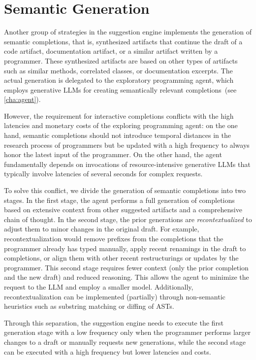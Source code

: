 
\section{Semantic Generation}
\label{sec:suggestions/generation}

Another group of strategies in the suggestion engine implements the generation of semantic completions, that is, synthesized artifacts that continue the draft of a code artifact, documentation artifact, or a similar artifact written by a programmer.
These synthesized artifacts are based on other types of artifacts such as similar methods, correlated classes, or documentation excerpts.
The actual generation is delegated to the exploratory programming agent, which employs generative LLMs for creating semantically relevant completions~(see \cref{cha:agent}).

However, the requirement for interactive completions conflicts with the high latencies and monetary costs of the exploring programming agent:
on the one hand, semantic completions should not introduce temporal distances in the research process of programmers but be updated with a high frequency to always honor the latest input of the programmer.
On the other hand, the agent fundamentally depends on invocations of resource-intensive generative LLMs that typically involve latencies of several seconds for complex requests.

To solve this conflict, we divide the generation of semantic completions into two stages.
In the first stage, the agent performs a full generation of completions based on extensive context from other suggested artifacts and a comprehensive chain of thought.
In the second stage, the prior generations are \emph{recontextualized} to adjust them to minor changes in the original draft.
For example, recontextualization would remove prefixes from the completions that the programmer already has typed manually, apply recent renamings in the draft to completions, or align them with other recent restructurings or updates by the programmer.
This second stage requires fewer context (only the prior completion and the new draft) and reduced reasoning.
This allows the agent to minimize the request to the LLM and employ a smaller model.
Additionally, recontextualization can be implemented (partially) through non-semantic heuristics such as substring matching or diffing of ASTs.

Through this separation, the suggestion engine needs to execute the first generation stage with a low frequency only when the programmer performs larger changes to a draft or manually requests new generations, while the second stage can be executed with a high frequency but lower latencies and costs.

